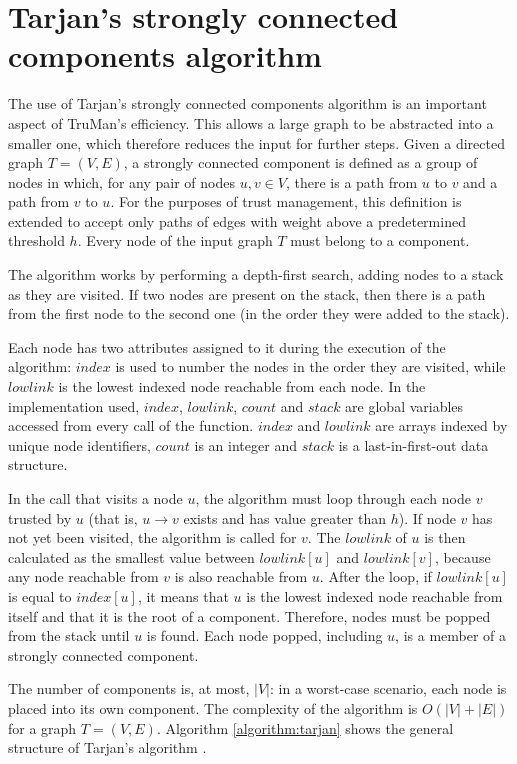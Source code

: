 \section{Tarjan's strongly connected components algorithm}
\label{section:tarjan}
The use of Tarjan's strongly connected components algorithm \citep{tarjan1972depth} is an important aspect of TruMan's efficiency.
This allows a large graph to be abstracted into a smaller one, which therefore reduces the input for further steps.
Given a directed graph $T = (V,E)$, a strongly connected component is defined as a group of nodes in which, for any pair of nodes $u, v \in V$, there is a path from $u$ to $v$ and a path from $v$ to $u$.
For the purposes of trust management, this definition is extended to accept only paths of edges with weight above a predetermined threshold $h$.
Every node of the input graph $T$ must belong to a component.

The algorithm works by performing a depth-first search, adding nodes to a stack as they are visited.
If two nodes are present on the stack, then there is a path from the first node to the second one (in the order they were added to the stack).

Each node has two attributes assigned to it during the execution of the algorithm: $index$ is used to number the nodes in the order they are visited, while $lowlink$ is the lowest indexed node reachable from each node.
In the implementation used, $index$, $lowlink$, $count$ and $stack$ are global variables accessed from every call of the function.
$index$ and $lowlink$ are arrays indexed by unique node identifiers, $count$ is an integer and $stack$ is a last-in-first-out data structure.

In the call that visits a node $u$, the algorithm must loop through each node $v$ trusted by $u$ (that is, $u \rightarrow v$ exists and has value greater than $h$).
If node $v$ has not yet been visited, the algorithm is called for $v$.
The $lowlink$ of $u$ is then calculated as the smallest value between $lowlink[u]$ and $lowlink[v]$, because any node reachable from $v$ is also reachable from $u$.
After the loop, if $lowlink[u]$ is equal to $index[u]$, it means that $u$ is the lowest indexed node reachable from itself and that it is the root of a component.
Therefore, nodes must be popped from the stack until $u$ is found.
Each node popped, including $u$, is a member of a strongly connected component.

The number of components is, at most, $|V|$: in a worst-case scenario, each node is placed into its own component.
The complexity of the algorithm is $O(|V|+|E|)$ for a graph $T = (V,E)$.
Algorithm \autoref{algorithm:tarjan} shows the general structure of Tarjan's algorithm  \citep{tarjan1972depth}.

